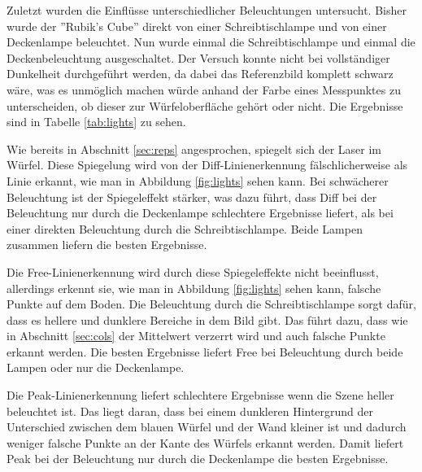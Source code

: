 \documentclass[ngerman,a4paper,parskip=half]{scrartcl}
\begin{document}
Zuletzt wurden die Einflüsse unterschiedlicher Beleuchtungen untersucht. Bisher wurde der ''Rubik's Cube'' direkt von einer Schreibtischlampe und von einer Deckenlampe beleuchtet. Nun wurde einmal die Schreibtischlampe und einmal die Deckenbeleuchtung ausgeschaltet. Der Versuch konnte nicht bei vollständiger Dunkelheit durchgeführt werden, da dabei das Referenzbild komplett schwarz wäre, was es unmöglich machen würde anhand der Farbe eines Messpunktes zu unterscheiden, ob dieser zur Würfeloberfläche gehört oder nicht. Die Ergebnisse sind in Tabelle \ref{tab:lights} zu sehen.

Wie bereits in Abschnitt \ref{sec:reps} angesprochen, spiegelt sich der Laser im Würfel. Diese Spiegelung wird von der Diff-Linienerkennung fälschlicherweise als Linie erkannt, wie man in Abbildung \ref{fig:lights} sehen kann. Bei schwächerer Beleuchtung ist der Spiegeleffekt stärker, was dazu führt, dass Diff bei der Beleuchtung nur durch die Deckenlampe schlechtere Ergebnisse liefert, als bei einer direkten Beleuchtung durch die Schreibtischlampe. Beide Lampen zusammen liefern die besten Ergebnisse.

Die Free-Linienerkennung wird durch diese Spiegeleffekte nicht beeinflusst, allerdings erkennt sie, wie man in Abbildung \ref{fig:lights} sehen kann, falsche Punkte auf dem Boden. Die Beleuchtung durch die Schreibtischlampe sorgt dafür, dass es hellere und dunklere Bereiche in dem Bild gibt. Das führt dazu, dass wie in Abschnitt \ref{sec:cols} der Mittelwert verzerrt wird und auch falsche Punkte erkannt werden. Die besten Ergebnisse liefert Free bei Beleuchtung durch beide Lampen oder nur die Deckenlampe.

Die Peak-Linienerkennung liefert schlechtere Ergebnisse wenn die Szene heller beleuchtet ist. Das liegt daran, dass bei einem dunkleren Hintergrund der Unterschied zwischen dem blauen Würfel und der Wand kleiner ist und dadurch weniger falsche Punkte an der Kante des Würfels erkannt werden. Damit liefert Peak bei der Beleuchtung nur durch die Deckenlampe die besten Ergebnisse.
\end{document}
